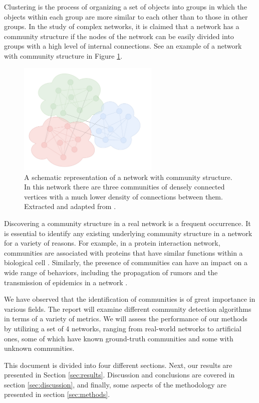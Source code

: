 Clustering is the process of organizing a set of objects into groups in which the objects within each group are more similar to each other than to those in other groups. In the study of complex networks, it is claimed that a network has a community structure if the nodes of the network can be easily divided into groups with a high level of internal connections. See an example of a network with community structure in Figure \ref{fig:example_communities}.

\begin{figure}[!htb]
    \centering
    \includegraphics[width=0.6\textwidth]{images/network_w_community.pdf}
    \caption{A schematic representation of a network with community structure. In this network there are three communities of densely connected vertices with a much lower density of connections between them. Extracted and adapted from \cite{doi:10.1073/pnas.122653799}.}
    \label{fig:example_communities}
\end{figure}

Discovering a community structure in a real network is a frequent occurrence. It is essential to identify any existing underlying community structure in a network for a variety of reasons. For example, in a protein interaction network, communities are associated with proteins that have similar functions within a biological cell \cite{Zare2010}. Similarly, the presence of communities can have an impact on a wide range of behaviors, including the propagation of rumors and the transmission of epidemics in a network \cite{UCAM-CL-TR-767, ReisPinheiro2021}.

We have observed that the identification of communities is of great importance in various fields. The report will examine different community detection algorithms in terms of a variety of metrics. We will assess the performance of our methods by utilizing a set of 4 networks, ranging from real-world networks to artificial ones, some of which have known ground-truth communities and some with unknown communities.

This document is divided into four different sections. Next, our results are presented in Section \ref{sec:results}. Discussion and conclusions are covered in section \ref{sec:discussion}, and finally, some aspects of the methodology are presented in section \ref{sec:methods}.
